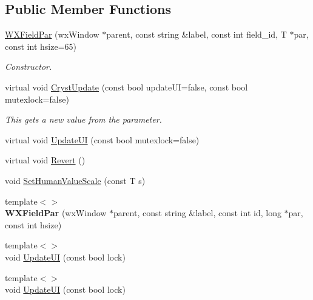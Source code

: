\subsection*{Public Member Functions}
\begin{DoxyCompactItemize}
\item 
\mbox{\label{class_obj_cryst_1_1_w_x_field_par_acbd12ff692a7020f7145394379ed462f}} 
\mbox{\hyperlink{class_obj_cryst_1_1_w_x_field_par_acbd12ff692a7020f7145394379ed462f}{W\+X\+Field\+Par}} (wx\+Window $\ast$parent, const string \&label, const int field\+\_\+id, T $\ast$par, const int hsize=65)
\begin{DoxyCompactList}\small\item\em Constructor. \end{DoxyCompactList}\item 
\mbox{\label{class_obj_cryst_1_1_w_x_field_par_a9cee56b1dc7a9695535c7461be7d9e5f}} 
virtual void \mbox{\hyperlink{class_obj_cryst_1_1_w_x_field_par_a9cee56b1dc7a9695535c7461be7d9e5f}{Cryst\+Update}} (const bool update\+UI=false, const bool mutexlock=false)
\begin{DoxyCompactList}\small\item\em This gets a new value from the parameter. \end{DoxyCompactList}\item 
virtual void \mbox{\hyperlink{class_obj_cryst_1_1_w_x_field_par_a1777f9713ca5d40c29c5bd3ab5484aff}{Update\+UI}} (const bool mutexlock=false)
\item 
virtual void \mbox{\hyperlink{class_obj_cryst_1_1_w_x_field_par_a928b1b8c7d47e3e99a29975c4dd51d58}{Revert}} ()
\item 
void \mbox{\hyperlink{class_obj_cryst_1_1_w_x_field_par_aea7020b96899dfcd41e568f8705fa2f8}{Set\+Human\+Value\+Scale}} (const T s)
\item 
\mbox{\label{class_obj_cryst_1_1_w_x_field_par_a22d504f85db90e66fa53e8cc4c53a933}} 
{\footnotesize template$<$$>$ }\\{\bfseries W\+X\+Field\+Par} (wx\+Window $\ast$parent, const string \&label, const int id, long $\ast$par, const int hsize)
\item 
{\footnotesize template$<$$>$ }\\void \mbox{\hyperlink{class_obj_cryst_1_1_w_x_field_par_a5ca0e76f414e64005b295719219ff1e7}{Update\+UI}} (const bool lock)
\item 
{\footnotesize template$<$$>$ }\\void \mbox{\hyperlink{class_obj_cryst_1_1_w_x_field_par_a97d7133e0348b189e699e5c0c23bf97c}{Update\+UI}} (const bool lock)
\end{DoxyCompactItemize}
